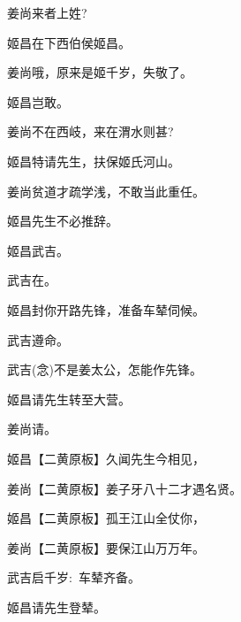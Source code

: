 {姜尚\hspace{30pt}来者上姓?

姬昌\hspace{30pt}在下西伯侯姬昌。

姜尚\hspace{30pt}哦，原来是姬千岁，失敬了。

姬昌\hspace{30pt}岂敢。

姜尚\hspace{30pt}不在西岐，来在渭水则甚?

姬昌\hspace{30pt}特请先生，扶保姬氏河山。

姜尚\hspace{30pt}贫道才疏学浅，不敢当此重任。

姬昌\hspace{30pt}先生不必推辞。

姬昌\hspace{30pt}武吉。

武吉\hspace{30pt}在。

姬昌\hspace{30pt}封你开路先锋，准备车辇伺候。

武吉\hspace{30pt}遵命。

武吉\hspace{30pt}({\akai 念})不是姜太公，怎能作先锋。

姬昌\hspace{30pt}请先生转至大营。

姜尚\hspace{30pt}请。

姬昌\hspace{30pt}【{\akai 二黄原板}】久闻先生今相见，

姜尚\hspace{30pt}【{\akai 二黄原板}】姜子牙八十二才遇名贤。

姬昌\hspace{30pt}【{\akai 二黄原板}】孤王江山全仗你，

姜尚\hspace{30pt}【{\akai 二黄原板}】要保江山万万年。

\vspace{5pt}

\textrm{武吉\hspace{30pt}启千岁:~车辇齐备。}

\textrm{姬昌\hspace{30pt}请先生登辇。}

}
